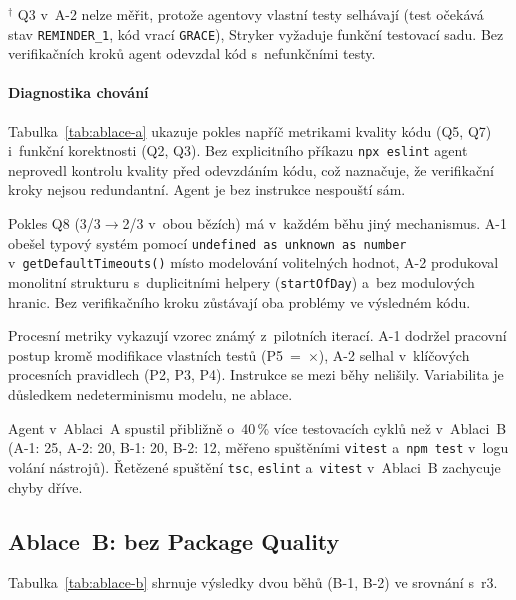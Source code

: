 $^\dagger$ \acs{Q3} v~A-2 nelze měřit, protože agentovy vlastní testy selhávají
(test očekává stav \texttt{REMINDER\_1}, kód vrací \texttt{GRACE}),
Stryker vyžaduje funkční testovací sadu. Bez verifikačních kroků agent
odevzdal kód s~nefunkčními testy.

\paragraph{Diagnostika chování}
Tabulka~\ref{tab:ablace-a} ukazuje pokles napříč metrikami kvality
kódu (\acs{Q5}, \acs{Q7}) i~funkční korektnosti (\acs{Q2}, \acs{Q3}).
Bez explicitního příkazu \texttt{npx eslint} agent neprovedl kontrolu
kvality před odevzdáním kódu, což naznačuje, že verifikační kroky
nejsou redundantní. Agent je bez instrukce nespouští sám.

Pokles \acs{Q8} (3/3$\to$2/3 v~obou bězích) má v~každém běhu jiný
mechanismus. A-1 obešel typový systém pomocí \texttt{undefined as
unknown as number} v~\texttt{getDefaultTimeouts()} místo modelování
volitelných hodnot, A-2 produkoval monolitní strukturu s~duplicitními
helpery (\texttt{startOfDay}) a~bez modulových hranic. Bez verifikačního
kroku zůstávají oba problémy ve výsledném kódu.

Procesní metriky vykazují vzorec známý z~pilotních iterací. A-1
dodržel pracovní postup kromě modifikace vlastních testů (\acs{P5}~=~$\times$),
A-2 selhal v~klíčových procesních pravidlech (\acs{P2}, \acs{P3}, \acs{P4}).
Instrukce se mezi běhy nelišily. Variabilita je důsledkem nedeterminismu
modelu, ne ablace.

Agent v~Ablaci~A spustil přibližně o~40\,\% více testovacích cyklů
než v~Ablaci~B (A-1: 25, A-2: 20, B-1: 20, B-2: 12, měřeno spuštěními
\texttt{vitest} a~\texttt{npm test} v~logu volání nástrojů). Řetězené
spuštění \texttt{tsc}, \texttt{eslint} a~\texttt{vitest} v~Ablaci~B
zachycuje chyby dříve.


\subsection{Ablace~B: bez Package Quality}
\label{sec:ablace-b}

Tabulka~\ref{tab:ablace-b} shrnuje výsledky dvou běhů (B-1, B-2)
ve srovnání s~r3.

